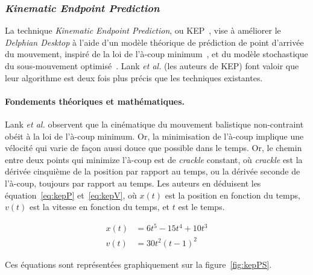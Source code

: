 	\subsubsection{\emph{Kinematic Endpoint Prediction}}
	La technique \emph{Kinematic Endpoint Prediction}, ou KEP~\cite{lank2007endpoint}, vise à améliorer le \emph{Delphian Desktop} à l'aide d'un modèle théorique de prédiction de point d'arrivée du mouvement, inspiré de la loi de l'à-coup minimum~\cite{hogan1984organizing, richardson2002comparing}\footnotemark{}, et du modèle stochastique du sous-mouvement optimisé~\cite{meyer1990speed}. Lank \emph{et al.} (les auteurs de KEP) font valoir que leur algorithme est deux fois plus précis que les techniques existantes.
	
	
	\paragraph{Fondements théoriques et mathématiques.}
	Lank \emph{et al.} observent que la cinématique du mouvement balistique non-contraint obéit à la loi de l'à-coup minimum. Or, la minimisation de l'à-coup implique une vélocité qui varie de façon aussi \og douce \fg{} que possible dans le temps. Or, le chemin entre deux points qui minimize l'à-coup est de \emph{crackle} constant, où \emph{crackle} est la dérivée cinquième de la position par rapport au temps, ou la dérivée seconde de l'à-coup, toujours par rapport au temps. Les auteurs en déduisent les équation~\ref{eq:kepP} et~\ref{eq:kepV}, où $x(t)$ est la position en fonction du temps, $v(t)$ est la vitesse en fonction du temps, et $t$ est le temps.
	
	\begin{align}
		\label{eq:kepP}
		x(t) &= 6t^{5} - 15t^{4} + 10t^{3} \\
		\label{eq:kepV}
		v(t) &= 30t^{2}(t - 1)^{2}
	\end{align}
	
	Ces équations sont représentées graphiquement sur la figure~\ref{fig:kepPS}.
	
